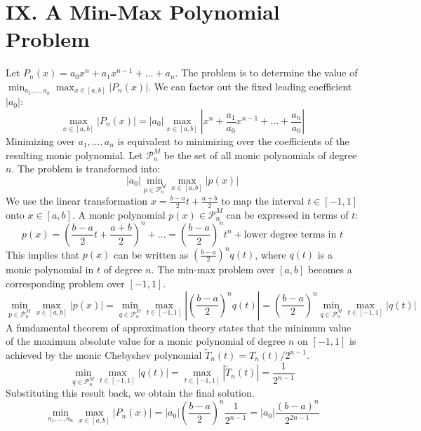 \documentclass[a4paper]{article}
\begin{document}
\section*{IX. A Min-Max Polynomial Problem}

Let $P_n(x) = a_0x^n + a_1x^{n-1} + \dots + a_n$. The problem is to determine the value of $\min_{a_1, \dots, a_n} \max_{x \in [a,b]} |P_n(x)|$.
We can factor out the fixed leading coefficient $|a_0|$:
\[
\max_{x \in [a,b]} |P_n(x)| = |a_0| \max_{x \in [a,b]} |x^n + \frac{a_1}{a_0}x^{n-1} + \dots + \frac{a_n}{a_0}|
\]
Minimizing over $a_1, \dots, a_n$ is equivalent to minimizing over the coefficients of the resulting monic polynomial. Let $\mathcal{P}_n^M$ be the set of all monic polynomials of degree $n$. The problem is transformed into:
\[
|a_0| \min_{p \in \mathcal{P}_n^M} \max_{x \in [a,b]} |p(x)|
\]
We use the linear transformation $x = \frac{b-a}{2}t + \frac{a+b}{2}$ to map the interval $t \in [-1, 1]$ onto $x \in [a,b]$.
A monic polynomial $p(x) \in \mathcal{P}_n^M$ can be expressed in terms of $t$:
\[
p(x) = \left(\frac{b-a}{2}t + \frac{a+b}{2}\right)^n + \dots = \left(\frac{b-a}{2}\right)^n t^n + \text{lower degree terms in } t
\]
This implies that $p(x)$ can be written as $(\frac{b-a}{2})^n q(t)$, where $q(t)$ is a monic polynomial in $t$ of degree $n$.
The min-max problem over $[a,b]$ becomes a corresponding problem over $[-1,1]$.
\[
\min_{p \in \mathcal{P}_n^M} \max_{x \in [a,b]} |p(x)| = \min_{q \in \mathcal{P}_n^M} \max_{t \in [-1,1]} \left|\left(\frac{b-a}{2}\right)^n q(t)\right| = \left(\frac{b-a}{2}\right)^n \min_{q \in \mathcal{P}_n^M} \max_{t \in [-1,1]} |q(t)|
\]
A fundamental theorem of approximation theory states that the minimum value of the maximum absolute value for a monic polynomial of degree $n$ on $[-1,1]$ is achieved by the monic Chebyshev polynomial $\tilde{T}_n(t) = T_n(t)/2^{n-1}$.
\[
\min_{q \in \mathcal{P}_n^M} \max_{t \in [-1,1]} |q(t)| = \max_{t \in [-1,1]} |\tilde{T}_n(t)| = \frac{1}{2^{n-1}}
\]
Substituting this result back, we obtain the final solution.
\[
\min_{a_1, \dots, a_n} \max_{x \in [a,b]} |P_n(x)| = |a_0| \left(\frac{b-a}{2}\right)^n \frac{1}{2^{n-1}} = |a_0| \frac{(b-a)^n}{2^{2n-1}}
\]
\end{document}
